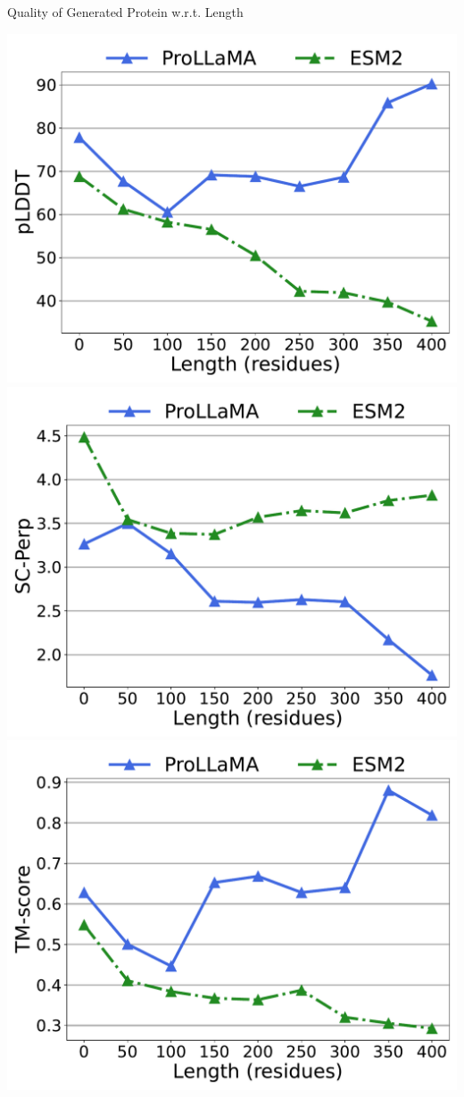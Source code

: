 \documentclass[dvipsnames,
hyperref={citecolor=black}
]{beamer}
\begin{document}
\begin{frame}{Quality of Generated Protein w.r.t. Length}%
	\begin{center}
		\includegraphics[scale=0.23]{images/combined_length_plddt_zhexiantu.pdf}
		\includegraphics[scale=0.23]{images/combined_length_scperp_zhexiantu.pdf}
		\includegraphics[scale=0.23]{images/combined_length_alntmscore_zhexiantu.pdf}

\end{center}
\end{frame}
\end{document}
